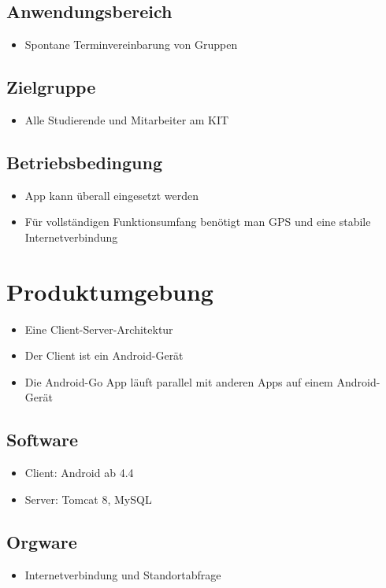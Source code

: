 \documentclass{scrartcl}
\begin{document}
	\subsection{Anwendungsbereich}
	\begin{itemize}	        
		\item Spontane Terminvereinbarung von Gruppen
	\end{itemize}
	\subsection{Zielgruppe}
	\begin{itemize}	        
		\item Alle Studierende und Mitarbeiter am KIT
	\end{itemize}
	\subsection{Betriebsbedingung}
	\begin{itemize}	        
		\item App kann überall eingesetzt werden
		\item Für vollständigen Funktionsumfang benötigt man GPS und eine stabile Internetverbindung
	\end{itemize}
	
	\newpage
	
	
	\section{Produktumgebung}
	\begin{itemize}	        
		\item Eine Client-Server-Architektur
		\item Der Client ist ein Android-Gerät
		\item Die Android-Go App läuft parallel mit anderen Apps auf einem Android-Gerät
	\end{itemize}
	\subsection{Software}
	\begin{itemize}	        
		\item Client: Android ab 4.4
		\item Server: Tomcat 8, MySQL
	\end{itemize}	
	\subsection{Orgware}
	\begin{itemize}	        
		\item Internetverbindung und Standortabfrage
	\end{itemize}
\end{document}
